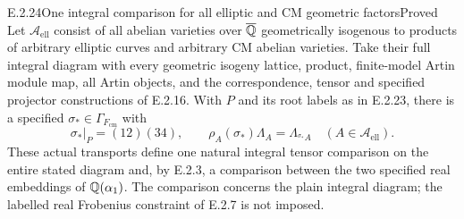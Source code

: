 \begin{result}{E.2.24}{One integral comparison for all elliptic and CM geometric factors}{Proved}
Let \(\mathcal A_{\mathrm{ell}}\) consist of all abelian
varieties over \(\overline{\mathbb Q}\) geometrically isogenous to products
of arbitrary elliptic curves and arbitrary CM abelian varieties.
Take their full integral diagram with every geometric isogeny
lattice, product, finite-model Artin module map, all Artin
objects, and the correspondence, tensor and specified projector
constructions of E.2.16.
With \(P\) and its root labels as in E.2.23, there is a
specified \(\sigma_*\in\Gamma_{F_{\mathrm{cm}}}\) with
\[
 \sigma_*|_P=(12)(34),\qquad
 \rho_A(\sigma_*)\Lambda_A=\Lambda_{{}^{\sigma_*}A}
            \quad(A\in\mathcal A_{\mathrm{ell}}).
 \tag{E.2.24a}
\]
These actual transports define one natural integral tensor
comparison on the entire stated diagram and, by E.2.3, a
comparison between the two specified real embeddings of
\(\mathbb Q(\alpha_1)\). The comparison concerns the plain integral
diagram; the labelled real Frobenius constraint of E.2.7 is
not imposed.
\end{result}
